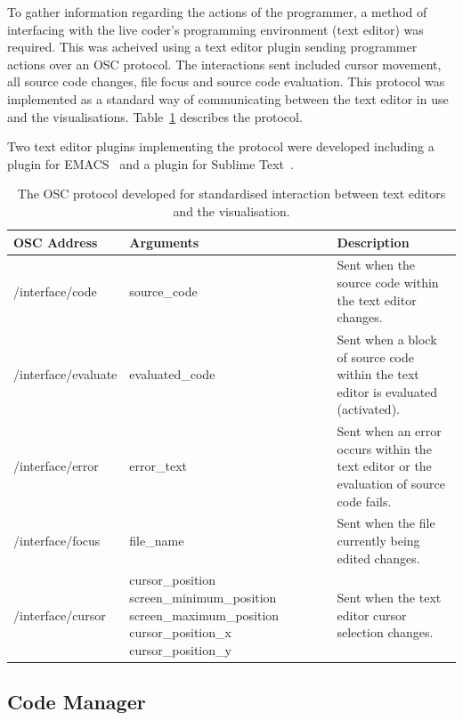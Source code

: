 To gather information regarding the actions of the programmer, a method of interfacing with the live coder's programming environment (text editor) was required. This was acheived using a text editor plugin sending programmer actions over an \ac{OSC} protocol. The interactions sent included cursor movement, all source code changes, file focus and source code evaluation. This protocol was implemented as a standard way of communicating between the text editor in use and the visualisations. Table~\ref{table:osc-protocol} describes the protocol.

Two text editor plugins implementing the protocol were developed including a plugin for EMACS~\cite{Stallman1981} and a plugin for Sublime Text~\cite{Skinner2013}.

\begin{table}
  \centering
  \begin{tabular}{|l|p{4.75cm}|p{4.75cm}|}
  \hline
  \textbf{OSC Address} & \textbf{Arguments} & \textbf{Description}\\
  \hline
	/interface/code & source\_code & Sent when the source code within the text editor changes.\\
	\hline
	/interface/evaluate & evaluated\_code & Sent when a block of source code within the text editor is evaluated (activated). \\
	\hline
	/interface/error & error\_text & Sent when an error occurs within the text editor or the evaluation of source code fails.\\
	\hline
	/interface/focus & file\_name & Sent when the file currently being edited changes.\\
	\hline
	/interface/cursor & cursor\_position \newline screen\_minimum\_position \newline screen\_maximum\_position \newline cursor\_position\_x \newline cursor\_position\_y & Sent when the text editor cursor selection changes. \\
  \hline
  \end{tabular}
  \caption{The OSC protocol developed for standardised interaction between text editors and the visualisation.}
  \label{table:osc-protocol}
\end{table}

\subsection{Code Manager}


